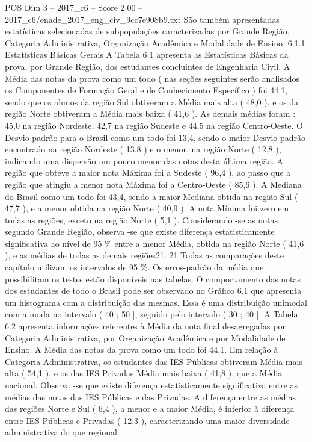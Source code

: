 \begin{textsample}{POS Dim 3 – 2017\_c6 – Score 2.00 – 2017\_c6/enade\_2017\_eng\_civ\_9cc7e908b9.txt}
São também apresentadas estatísticas selecionadas de subpopulações caracterizadas por Grande Região, Categoria Administrativa, Organização Acadêmica e Modalidade de Ensino. 6.1.1 Estatísticas Básicas Gerais A Tabela 6.1 apresenta as Estatísticas Básicas da prova, por Grande Região, dos estudantes concluintes de Engenharia Civil.
A Média das notas da prova como um todo ( nas seções seguintes serão analisados os Componentes de Formação Geral e de Conhecimento Específico ) foi 44,1, sendo que os alunos da região Sul obtiveram a Média mais alta ( 48,0 ), e os da região Norte obtiveram a Média mais baixa ( 41,6 ).
As demais médias foram : 45,0 na região Nordeste, 42,7 na região Sudeste e 44,5 na região Centro-Oeste.
O Desvio padrão para o Brasil como um todo foi 13,4, sendo o maior Desvio padrão encontrado na região Nordeste ( 13,8 ) e o menor, na região Norte ( 12,8 ), indicando uma dispersão um pouco menor das notas desta última região.
A região que obteve a maior nota Máxima foi a Sudeste ( 96,4 ), ao passo que a região que atingiu a menor nota Máxima foi a Centro-Oeste ( 85,6 ).
A Mediana do Brasil como um todo foi 43,4, sendo a maior Mediana obtida na região Sul ( 47,7 ), e a menor obtida na região Norte ( 40,9 ).
A nota Mínima foi zero em todas as regiões, exceto na região Norte ( 5,1 ).
Considerando -se as notas segundo Grande Região, observa -se que existe diferença estatisticamente significativa ao nível de 95 \% entre a menor Média, obtida na região Norte ( 41,6 ), e as médias de todas as demais regiões21. 21 Todas as comparações deste capítulo utilizam os intervalos de 95 \%.
Os erros-padrão da média que possibilitam os testes estão disponíveis nas tabelas.
O comportamento das notas dos estudantes de todo o Brasil pode ser observado no Gráfico 6.1 que apresenta um histograma com a distribuição das mesmas.
Essa é uma distribuição unimodal com a moda no intervalo ( 40 ; 50 ], seguido pelo intervalo ( 30 ; 40 ].
A Tabela 6.2 apresenta informações referentes à Média da nota final desagregadas por Categoria Administrativa, por Organização Acadêmica e por Modalidade de Ensino.
A Média das notas da prova como um todo foi 44,1.
Em relação à Categoria Administrativa, os estudantes das IES Públicas obtiveram Média mais alta ( 54,1 ), e os das IES Privadas Média mais baixa ( 41,8 ), que a Média nacional.
Observa -se que existe diferença estatisticamente significativa entre as médias das notas das IES Públicas e das Privadas.
A diferença entre as médias das regiões Norte e Sul ( 6,4 ), a menor e a maior Média, é inferior à diferença entre IES Públicas e Privadas ( 12,3 ), caracterizando uma maior diversidade administrativa do que regional.

\end{textsample}
